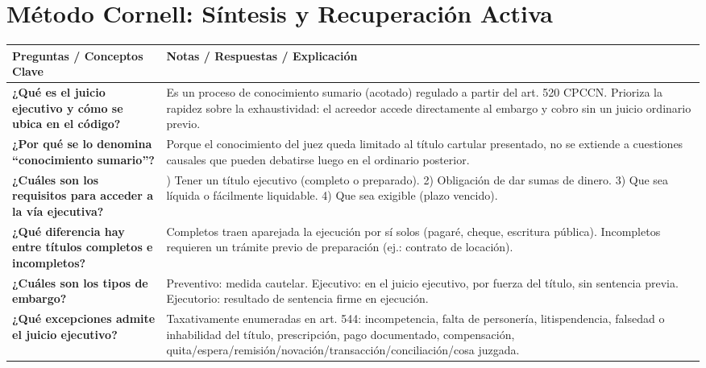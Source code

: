 \documentclass[12pt,oneside]{book}
\begin{document}
\chapter*{Método Cornell: Síntesis y Recuperación Activa}

\begin{table}[H]
\centering
\begin{tabularx}{\textwidth}{
    >{\raggedright\arraybackslash}p{}
    >{\raggedright\arraybackslash}X
}
\toprule
\textbf{Preguntas / Conceptos Clave} & \textbf{Notas / Respuestas / Explicación} \\
\midrule

\textbf{¿Qué es el juicio ejecutivo y cómo se ubica en el código?} & Es un proceso de conocimiento sumario (acotado) regulado a partir del art. 520 CPCCN. Prioriza la rapidez sobre la exhaustividad: el acreedor accede directamente al embargo y cobro sin un juicio ordinario previo. \\

\textbf{¿Por qué se lo denomina ``conocimiento sumario''?} & Porque el conocimiento del juez queda limitado al título cartular presentado, no se extiende a cuestiones causales que pueden debatirse luego en el ordinario posterior. \\

\textbf{¿Cuáles son los requisitos para acceder a la vía ejecutiva?} & 1) Tener un título ejecutivo (completo o preparado). 2) Obligación de dar sumas de dinero. 3) Que sea líquida o fácilmente liquidable. 4) Que sea exigible (plazo vencido). \\

\textbf{¿Qué diferencia hay entre títulos completos e incompletos?} & Completos traen aparejada la ejecución por sí solos (pagaré, cheque, escritura pública). Incompletos requieren un trámite previo de preparación (ej.: contrato de locación). \\

\textbf{¿Cuáles son los tipos de embargo?} & Preventivo: medida cautelar. Ejecutivo: en el juicio ejecutivo, por fuerza del título, sin sentencia previa. Ejecutorio: resultado de sentencia firme en ejecución. \\

\textbf{¿Qué excepciones admite el juicio ejecutivo?} & Taxativamente enumeradas en art. 544: incompetencia, falta de personería, litispendencia, falsedad o inhabilidad del título, prescripción, pago documentado, compensación, quita/espera/remisión/novación/transacción/conciliación/cosa juzgada. \\


\end{tabularx}
\end{table}
\end{document}
